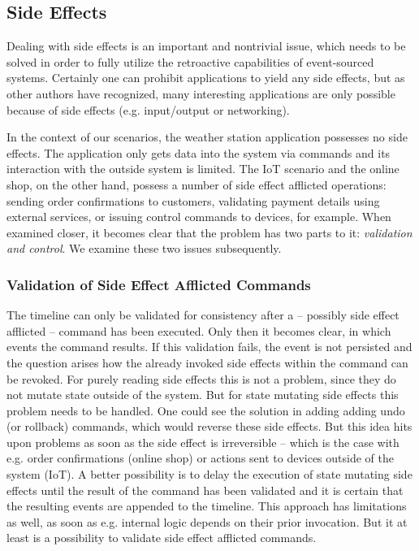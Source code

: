 \subsection{Side Effects}
\label{sec:side-effects}
Dealing with side effects is an important and nontrivial issue, which needs
to be solved in order to fully utilize the retroactive capabilities of 
event-sourced systems. Certainly one can prohibit applications to yield any 
side effects, but as other authors \cite{Jones2001, Salkeld2011} have 
recognized, many interesting applications are only possible because of side 
effects (e.g. input/output or networking).

In the context of our scenarios, the weather station application possesses no 
side effects. The application only gets data into the system via commands and 
its interaction with the outside system is limited. 
The IoT scenario and the online shop, on the other hand, possess a number of 
side effect afflicted operations: sending order confirmations to customers, 
validating payment details using external services, or issuing control commands 
to devices, for example. When examined closer, it becomes clear that the 
problem has two parts to it: \emph{validation and control}.
We examine these two issues subsequently.

\subsubsection{Validation of Side Effect Afflicted Commands}
\label{subsec:validation}
The timeline can only be validated for consistency after a -- possibly side 
effect afflicted -- command has been executed. Only then it becomes clear, in 
which events the command results. If this validation fails, the event is not 
persisted and the question arises how the already invoked side effects within 
the command can be revoked. For purely reading side effects this is not a 
problem, since they do not mutate state outside of the system. But for state 
mutating side effects this problem needs to be handled.
One could see the solution in adding adding undo (or rollback) commands, which 
would reverse these side effects. But this idea hits upon problems as soon as 
the side effect is irreversible -- which is the case with e.g. order confirmations 
(online shop) or actions sent to devices outside of the system (IoT).
A better possibility is to delay the execution of state mutating side effects
until the result of the command has been validated and it is certain that the 
resulting events are appended to the timeline.
This approach has limitations as well, as soon as e.g. internal logic depends 
on their prior invocation.
But it at least is a possibility to validate side effect afflicted commands.

